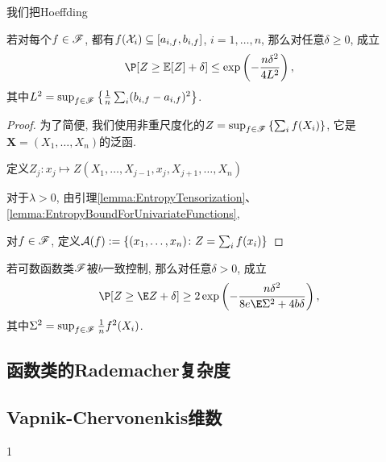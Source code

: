 我们把Hoeffding

\begin{theorem}[泛函Hoeffding不等式]
	若对每个$f \in \mathscr{F}$, 都有$f(\mathcal{X}_i) \subseteq  [a_{i, f}, b_{i, f}]$, $i = 1, \dots, n$,  那么对任意$\delta \geq 0$, 成立
	\begin{equation}
		\P[ Z \geq \mathbb{E}[Z] + \delta] 
		\leq \exp \left( - \frac{n \delta^2}{4 L^2} \right), 
	\end{equation}
	其中$L^2 = \sup_{f \in \mathscr{F}} \left\{ \frac{1}{n} \sum_i (b_{i, f} - a_{i, f})^2 \right\}$. 
\end{theorem}

\begin{proof}
	为了简便, 我们使用非重尺度化的$Z = \sup_{f \in \mathscr{F}} \left\{ \sum_i f(X_i) \right\}$, 它是$\bm X = (X_1, \dots, X_n)$的泛函.  
	
	定义$Z_j \colon x_j \mapsto Z(X_1, \dots, X_{j-1}, x_j, X_{j+1}, \dots, X_n)$
	
	对于$\lambda > 0$, 由引理\ref{lemma:EntropyTensorization}、 \ref{lemma:EntropyBoundForUnivariateFunctions}, 
	
	对$f \in \mathscr{F}$, 定义$\mathcal{A}(f) := \left\{ (x_1, \dots, x_n) \colon Z = \sum_i f(x_i) \right\}$
\end{proof}


\begin{theorem}[经验过程的Talagrand集中度]
	若可数函数类$\mathscr{F}$被$b$一致控制, 那么对任意$\delta > 0$, 成立
	\begin{equation*}
		\P[ Z \geq \E Z + \delta] 
		\geq 2 \exp \left( - \frac{n \delta^2}{8 e \E \Sigma^2 + 4 b \delta} \right), 
	\end{equation*}
	其中$\Sigma^2 = \sup_{f \in \mathscr{F}} \frac1n f^2(X_i)$. 
\end{theorem}

\subsection{函数类的Rademacher复杂度}

























\subsection{Vapnik-Chervonenkis维数}































1